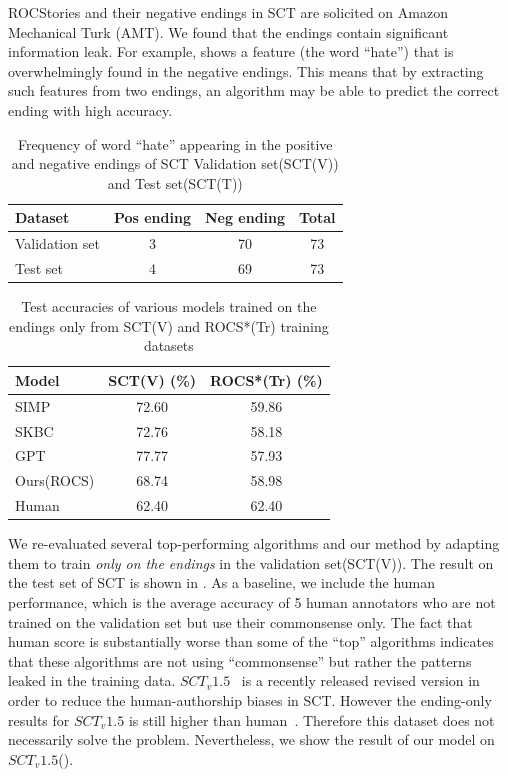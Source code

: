 ROCStories and their negative endings in SCT are solicited
on Amazon Mechanical Turk (AMT). We found that the endings
contain significant information leak. For example, 
shows a feature (the word ``hate'') that is overwhelmingly found 
in the negative endings.
This means that by extracting such features from two endings, an algorithm
may be able to predict the correct ending with high accuracy. 

\begin{table}[th!]
\small
\centering
\begin{tabular}{lccc}
\hline
\textbf{Dataset}& Pos ending& Neg ending &Total\\
\hline
Validation set & 3  & 70 &73\\
Test set          & 4  & 69 &73\\
\hline
\end{tabular}
\caption{Frequency of word ``hate'' appearing in the positive and 
negative endings of SCT Validation set(SCT(V)) and Test set(SCT(T))}
\label{tab:hate}
\end{table}

\begin{table}[th!]
\small
\centering
\begin{tabular}{lcc}
\hline
\textbf{Model}& SCT(V) (\%) &ROCS*(Tr) (\%)\\
\hline
SIMP& 72.60 &59.86\\
SKBC&72.76&58.18\\
GPT& 77.77 &57.93\\
Ours(ROCS)& 68.74&58.98\\
\hline
Human& 62.40&62.40\\
\hline
\end{tabular}
\caption{Test accuracies of various models trained on the endings only
from SCT(V) and ROCS*(Tr) training datasets}
\label{tab:end}
\end{table}


We re-evaluated several top-performing algorithms and our method
by adapting them to train {\em only on the endings} in the validation set(SCT(V)). 
The result on the test set of SCT is shown in . 
As a baseline, we include the human performance, which is the average
accuracy of 5 human annotators who are not
trained on the validation set but use their commonsense only. The fact
that human score is substantially worse than some of the ``top'' algorithms
indicates that these algorithms are not using ``commonsense'' but rather
the patterns leaked in the training data. $SCT_v1.5$~\cite{sharma2018tackling}
is a recently released revised version in order to reduce the 
human-authorship biases in SCT. However the ending-only results for
$SCT_v1.5$ is still higher than human~\cite{sharma2018tackling}. 
Therefore this dataset does not necessarily solve the problem. 
Nevertheless, we show the result of our model on $SCT_v1.5$().

